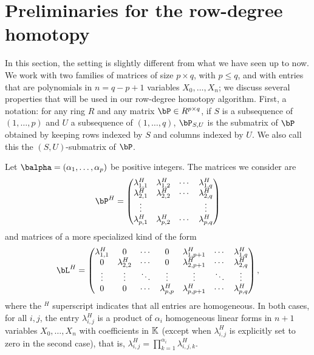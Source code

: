 \documentclass[12pt]{article}
\begin{document}
\section{Preliminaries for the row-degree homotopy}\label{sec:prel-row}

In this section, the setting is slightly different from what we have seen up
to now.  We work with two families of matrices of size $p \times q$,
with $p \le q$, and with entries that are polynomials in $n=q-p+1$
variables $X_0,\dots,X_n$; we discuss several properties that will
be used in our row-degree homotopy algorithm. First, a notation: for
any ring $R$ and any matrix $\bP \in R^{p\times q}$, if $S$ is a
subsequence of $(1,\dots,p)$ and $U$ a subsequence of $(1,\dots,q)$,
$\bP_{S,U}$ is the submatrix of $\bP$ obtained by keeping rows indexed
by $S$ and columns indexed by $U$. We also call this the
$(S,U)$-submatrix of $\bP$.

Let $\balpha=(\alpha_1,\dots,\alpha_p)$ be positive integers. The
matrices we consider are
\begin{align}\label{eqdef:type2}
\bP^H= \left( \begin{matrix}
\lambda^H_{1,1} & \lambda^H_{1,2} & \cdots & \lambda^H_{1, q}\\
 \lambda^H_{2,1} &  \lambda^H_{2,2} & \cdots & \lambda^H_{2, q}\\
 \vdots & & & \vdots\\
 \lambda^H_{p,1} &  \lambda^H_{p,2}& \cdots & \lambda^H_{p, q}
\end{matrix} \right)
\end{align}
and matrices of a more specialized kind of the form
\begin{align}\label{eqdef:type1}
\bL^H= \left( \begin{matrix}
\lambda^H_{1,1} & 0 & \cdots & 0 & \lambda^H_{1,p+1} & \cdots & \lambda^H_{1, q}\\
0 & \lambda^H_{2,2} & \cdots & 0 & \lambda^H_{2,p+1} & \cdots & \lambda^H_{2, q}\\
\vdots & \vdots & \ddots & \vdots & \vdots & \ddots & \vdots\\
0 & 0 & \cdots & \lambda^H_{p,p} & \lambda^H_{p,p+1} & \cdots & \lambda^H_{p, q}
\end{matrix} \right),
\end{align}
where the ${}^H$ superscript indicates that all entries are
homogeneous.  In both cases, for all $i,j$, the entry $\lambda^H_{i,j}$
is a product of $\alpha_i$ homogeneous linear forms in $n+1$ variables
$X_0,\dots,X_n$ with coefficients in $\mathbb{K}$ (except when
$\lambda^H_{i,j}$ is explicitly set to zero in the second case), that
is, $\lambda^H_{i,j}=\prod_{k=1}^{\alpha_i} \lambda^H_{i,j,k}$.  
\end{document}
